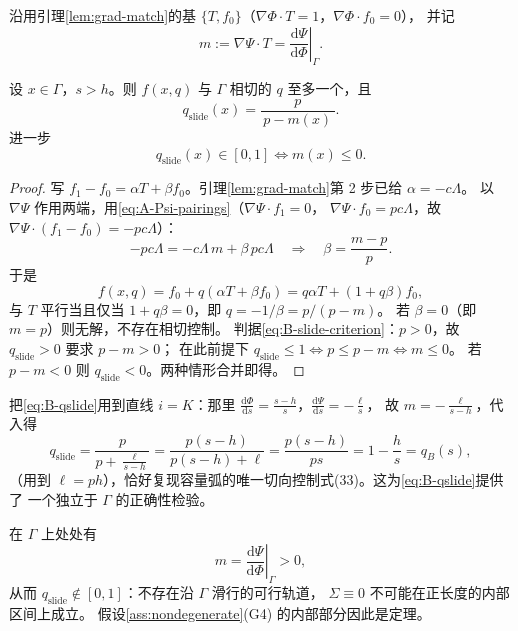 沿用引理\ref{lem:grad-match}的基 $\{T,f_0\}$（$\nabla\Phi\cdot T=1$，$\nabla\Phi\cdot f_0=0$），
并记
\begin{equation}
  m:=\nabla\Psi\cdot T=\left.\frac{\mathrm{d}\Psi}{\mathrm{d}\Phi}\right|_{\Gamma}.
  \label{eq:B-m-def}
\end{equation}

\begin{lemma}[滑行控制的闭式]
\label{lem:slide-control}
设 $x\in\Gamma$，$s>h$。则 $f(x,q)$ 与 $\Gamma$ 相切的 $q$ 至多一个，且
\begin{equation}
  \boxed{\;q_{\mathrm{slide}}(x)=\frac{p}{\,p-m(x)\,}.\;}
  \label{eq:B-qslide}
\end{equation}
进一步
\begin{equation}
  q_{\mathrm{slide}}(x)\in[0,1]\iff m(x)\le 0 .
  \label{eq:B-slide-criterion}
\end{equation}
\end{lemma}

\begin{proof}
写 $f_1-f_0=\alpha T+\beta f_0$。引理\ref{lem:grad-match}第 2 步已给 $\alpha=-c\Lambda$。
以 $\nabla\Psi$ 作用两端，用\eqref{eq:A-Psi-pairings}（$\nabla\Psi\cdot f_1=0$，
$\nabla\Psi\cdot f_0=pc\Lambda$，故 $\nabla\Psi\cdot(f_1-f_0)=-pc\Lambda$）：
\[
  -pc\Lambda=-c\Lambda\,m+\beta\,pc\Lambda
  \quad\Longrightarrow\quad
  \beta=\frac{m-p}{p}.
\]
于是
\[
  f(x,q)=f_0+q(\alpha T+\beta f_0)=q\alpha T+(1+q\beta)f_0 ,
\]
与 $T$ 平行当且仅当 $1+q\beta=0$，即 $q=-1/\beta=p/(p-m)$。
若 $\beta=0$（即 $m=p$）则无解，不存在相切控制。
判据\eqref{eq:B-slide-criterion}：$p>0$，故 $q_{\mathrm{slide}}>0$ 要求 $p-m>0$；
在此前提下 $q_{\mathrm{slide}}\le 1\iff p\le p-m\iff m\le0$。
若 $p-m<0$ 则 $q_{\mathrm{slide}}<0$。两种情形合并即得。
\end{proof}

\begin{remark}[自检：公式在容量线上复现 $q_B$]
\label{rem:slide-check}
把\eqref{eq:B-qslide}用到直线 $i=K$：那里
$\frac{\mathrm{d}\Phi}{\mathrm{d}s}=\frac{s-h}{s}$，$\frac{\mathrm{d}\Psi}{\mathrm{d}s}=-\frac{\ell}{s}$，
故 $m=-\frac{\ell}{s-h}$，代入得
\[
  q_{\mathrm{slide}}=\frac{p}{p+\frac{\ell}{s-h}}
  =\frac{p(s-h)}{p(s-h)+\ell}
  =\frac{p(s-h)}{ps}=1-\frac{h}{s}=q_B(s),
\]
（用到 $\ell=ph$），恰好复现容量弧的唯一切向控制式(33)。这为\eqref{eq:B-qslide}提供了
一个独立于 $\Gamma$ 的正确性检验。
\end{remark}

\begin{theorem}[无内部奇异弧]
\label{thm:no-singular}
在 $\Gamma$ 上处处有
\begin{equation}
  m=\left.\frac{\mathrm{d}\Psi}{\mathrm{d}\Phi}\right|_{\Gamma}>0 ,
  \label{eq:B-m-positive}
\end{equation}
从而 $q_{\mathrm{slide}}\notin[0,1]$：不存在沿 $\Gamma$ 滑行的可行轨道，
$\Sigma\equiv0$ 不可能在正长度的内部区间上成立。
假设\ref{ass:nondegenerate}(G4) 的内部部分因此是定理。
\end{theorem}

